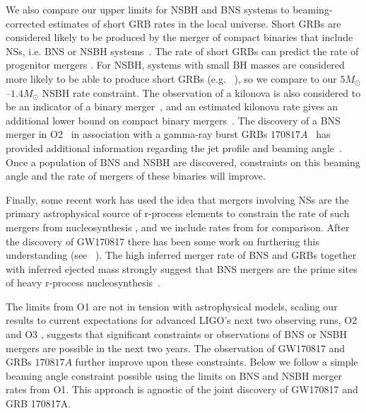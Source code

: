 We also compare our upper limits for \ac{NSBH} and \ac{BNS} systems to beaming-corrected
estimates of short \ac{GRB} rates in the local universe. Short \acp{GRB} are
considered likely to be produced by the merger of compact
binaries that include \acp{NS}, i.e. \ac{BNS} or \ac{NSBH}
systems~\citep{Berger:2013jza}. The rate of short \acp{GRB} can
predict the rate of progenitor mergers %
\citep{Coward:2012gn,Petrillo:2012ij,Siellez:2013hia,Fong:2015oha}.
For \ac{NSBH}, systems with small \ac{BH} masses are considered more likely to be able to
produce short \acp{GRB} (e.g.~ \citep{Duez:2009yz,Giacomazzo:2012zt,Pannarale:2015jia}), so we compare to our
$5 M_{\odot}$--$1.4 M_{\odot}$
\ac{NSBH} rate constraint. The observation of a kilonova is also considered to be an
indicator of a binary merger~\citep{Metzger:2011bv}, and an estimated kilonova rate
gives an additional lower bound on compact binary mergers~\citep{Jin:2015txa}.
The discovery of a BNS merger in \ac{O2}~\cite{TheLIGOScientific:2017qsa} in association
with a gamma-ray burst \acp{GRB} $170817A$~\cite{Abbott_2017_GRB_JOINT} has provided
additional information regarding the jet profile and beaming
angle~\cite{Abbott_2017_GRB_JOINT,Williams_2018}.
Once a population of BNS and NSBH are discovered, constraints on this beaming angle
and the rate of mergers of these binaries will improve.

Finally, some recent work has used the idea that mergers involving \acp{NS}
are the primary astrophysical source of r-process
elements \citep{1974ApJ...192L.145L,Qian:2007vq} to constrain the rate of such
mergers from nucleosynthesis \citep{Bauswein:2014vfa,Vangioni:2015ofa}, and we
include rates from \citep{Vangioni:2015ofa} for comparison. After the discovery
of GW170817 there has been some work on furthering this understanding
(see ~\cite{}). The high inferred merger rate of \ac{BNS} and \acp{GRB} together
with inferred ejected mass strongly suggest that \ac{BNS} mergers are
the prime sites of heavy r-process nucleosynthesis~\cite{Wang_2017, Siegel:2019mlp}.

The limits from \ac{O1} are not in tension with astrophysical models, scaling
our results to current expectations for advanced \ac{LIGO}'s next two observing runs,
O2 and O3 \citep{Aasi:2013wya}, suggests that significant constraints or
observations of \ac{BNS} or \ac{NSBH} mergers are possible in the next two years.
The observation of GW170817 and \acp{GRB} $170817A$ further improve upon these
constraints. Below we follow a simple beaming angle constraint possible using the
limits on BNS and NSBH merger rates from \ac{O1}. This approach is agnostic
of the joint discovery of GW170817 and GRB 170817A.

